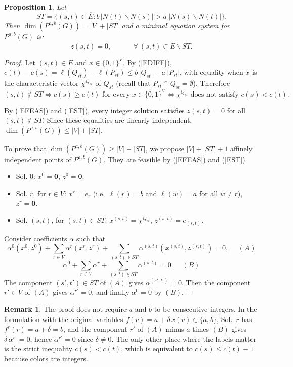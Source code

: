 \documentclass[a4paper,11pt]{article}
\newcommand{\ie}{{i.e.~}}
\newcommand{\Eb}{\overline{E}}
\newtheorem{prop}{Proposition}
\theoremstyle{definition}
\newtheorem{rem}{Remark}
\begin{document}
\begin{prop} \label{PDIM}
Let
$$ST = \{ (s,t) \in \Eb : b\,|N(t) \backslash N(s)| > a\,|N(s) \backslash N(t)| \}.$$
Then $\dim(P^{a,b}(G)) = |V| + |ST|$ and a minimal equation system for $P^{a,b}(G)$ is:
$$z(s,t) = 0,~~~~~~~~~~~~~~\forall~(s,t) \in \Eb \backslash ST.$$
\end{prop}
\begin{proof}
Let $(s,t) \in \Eb$ and $x \in \{0,1\}^V$. By (\ref{EDIFF}),
$c(t) - c(s) = \ell(Q_{st}) - \ell(P_{st}) \leq b\,|Q_{st}| - a\,|P_{st}|$, with equality when $x$ is the characteristic
vector $\chi^{Q_{st}}$ of $Q_{st}$ (recall that $P_{st} \cap Q_{st} = \emptyset$). Therefore
\begin{equation} \label{EST}
(s,t) \notin ST \iff c(s) \geq c(t) \textrm{ for every } x \in \{0,1\}^V \iff \chi^{Q_{st}} \textrm{ does not satisfy } c(s) < c(t).
\end{equation}

By (\ref{EFEAS}) and (\ref{EST}), every integer solution satisfies $z(s,t) = 0$ for all $(s,t) \notin ST$. Since these
equalities are linearly independent, $\dim(P^{a,b}(G)) \leq |V| + |ST|$.

To prove that $\dim(P^{a,b}(G)) \geq |V| + |ST|$, we propose $|V| + |ST| + 1$ affinely
independent points of $P^{a,b}(G)$. They are feasible by (\ref{EFEAS}) and (\ref{EST}).
\begin{itemize}
\item Sol. 0: $x^0 = \mathbf{0}$, $z^0 = \mathbf{0}$.
\item Sol. $r$, for $r \in V$: $x^r = e_r$ (\ie $\ell(r) = b$ and $\ell(w) = a$ for all $w \neq r$), $z^r = \mathbf{0}$.
\item Sol. $(s,t)$, for $(s,t) \in ST$: $x^{(s,t)} = \chi^{Q_{st}}$, $z^{(s,t)} = e_{(s,t)}$.
\end{itemize}
Consider coefficients $\alpha$ such that
$$\alpha^0 (x^0, z^0) + \sum_{r \in V} \alpha^r (x^r, z^r)
  + \sum_{(s,t) \in ST} \alpha^{(s,t)} (x^{(s,t)}, z^{(s,t)}) = 0,~~~~~~(A)$$
$$\alpha^0 + \sum_{r \in V} \alpha^r + \sum_{(s,t) \in ST} \alpha^{(s,t)} = 0.~~~~~~(B)$$
The component $(s',t') \in ST$ of $(A)$ gives $\alpha^{(s',t')} = 0$.
Then the component $r' \in V$ of $(A)$ gives $\alpha^{r'} = 0$, and finally $\alpha^0 = 0$ by $(B)$.
\end{proof}

\begin{rem}
The proof does not require $a$ and $b$ to be consecutive integers. In the formulation with the original variables
$f(v) = a + \delta\,x(v) \in \{a,b\}$, Sol.~$r$ has $f^r(r) = a + \delta = b$, and the component $r'$ of $(A)$
minus $a$ times $(B)$ gives $\delta\,\alpha^{r'} = 0$, hence $\alpha^{r'} = 0$ since $\delta \neq 0$.
The only other place where the labels matter is the strict inequality $c(s) < c(t)$, which is equivalent to
$c(s) \leq c(t) - 1$ because colors are integers.
\end{rem}
\end{document}
